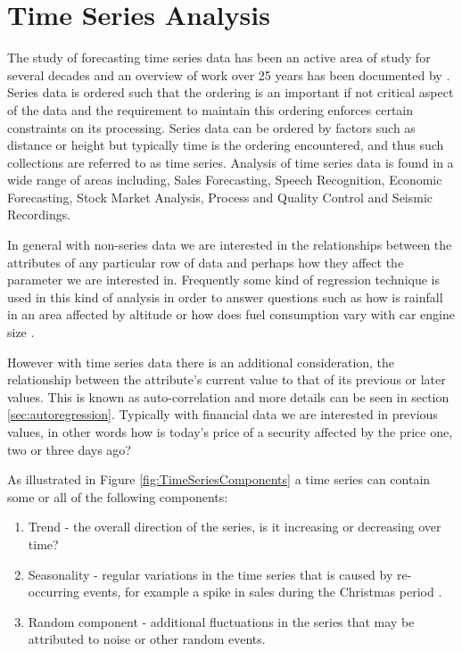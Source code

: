 \section{Time Series Analysis}
The study of forecasting time series data has been an active area of study for several decades and an overview of work over 25 years has been documented by \cite{DeGooijer2006443}. Series data is ordered such that the ordering is an important if not critical aspect of the data and the requirement to maintain this ordering enforces certain constraints on its processing. Series data can be ordered by factors such as distance or height but typically time is the ordering encountered, and thus such collections are referred to as time series. Analysis of time series data is found in a wide range of areas including, Sales Forecasting, Speech Recognition, Economic Forecasting, Stock Market Analysis, Process and Quality Control and Seismic Recordings.

In general with non-series data we are interested in the relationships between the attributes of any particular row of data and perhaps how they affect the parameter we are interested in. Frequently some kind of regression technique is used in this kind of analysis in order to answer questions such as how is rainfall in an area affected by altitude or how does fuel consumption vary with car engine size \citep{han2011data}.

However with time series data there is an additional consideration, the relationship between the attribute's current value to that of its previous or later values. This is known as auto-correlation \citep{mills2011} and more details can be seen in section \ref{sec:autoregression}. Typically with financial data we are interested in previous values, in other words how is today's price of a security affected by the price one, two or three days ago?

As illustrated in Figure \ref{fig:TimeSeriesComponents} a time series can contain some or all of the following components:
\begin{enumerate}
\item Trend - the overall direction of the series, is it increasing or decreasing over time?
\item Seasonality - regular variations in the time series that is caused by re-occurring events, for example a spike in sales during the Christmas period \citep{So2014212}.
\item Random component - additional fluctuations in the series that may be attributed to noise or other random events.
\end{enumerate}

